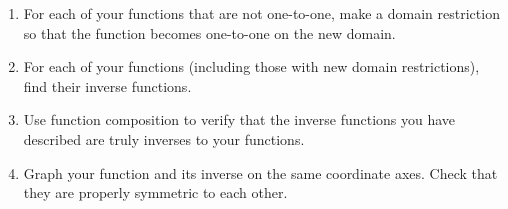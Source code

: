 \begin{enumerate}
\item For each of your functions that are not one-to-one, make a
  domain restriction so that the function becomes one-to-one on the
  new domain.

\vfill

\clearpage

\item For each of your functions (including those with new domain restrictions), find their inverse functions.

\vfill

\item Use function composition to verify that the inverse functions you have described are truly inverses to your functions.

\vfill

\clearpage

\item Graph your function and its inverse on the same coordinate axes.  Check that they are properly symmetric to each other.

\begin{multicols}{2}

\end{multicols}
\end{enumerate}
